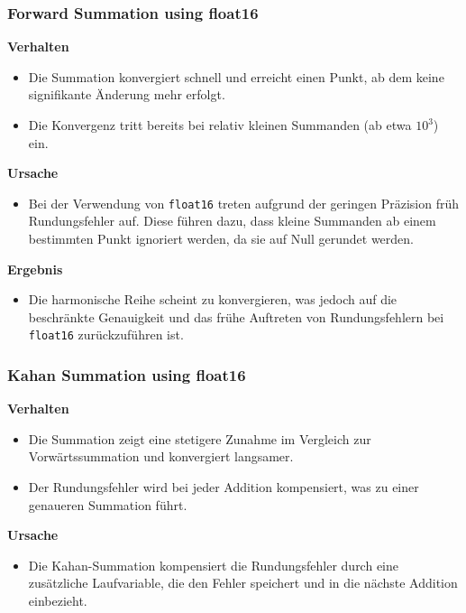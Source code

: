 \documentclass{scrartcl}
\begin{document}
\subsubsection{Forward Summation using float16}

\textbf{Verhalten}
\begin{itemize}
    \item Die Summation konvergiert schnell und erreicht einen Punkt, ab dem keine signifikante Änderung mehr erfolgt.
    \item Die Konvergenz tritt bereits bei relativ kleinen Summanden (ab etwa \(10^3\)) ein.
\end{itemize}

\textbf{Ursache}
\begin{itemize}
    \item Bei der Verwendung von \texttt{float16} treten aufgrund der geringen Präzision früh Rundungsfehler auf.
          Diese führen dazu, dass kleine Summanden ab einem bestimmten Punkt ignoriert
          werden, da sie auf Null gerundet werden.
\end{itemize}

\textbf{Ergebnis}
\begin{itemize}
    \item Die harmonische Reihe scheint zu konvergieren, was jedoch auf die beschränkte Genauigkeit und das frühe Auftreten von Rundungsfehlern bei \texttt{float16} zurückzuführen ist.
\end{itemize}

\subsubsection{Kahan Summation using float16}

\textbf{Verhalten}
\begin{itemize}
    \item Die Summation zeigt eine stetigere Zunahme im Vergleich zur Vorwärtssummation und konvergiert langsamer.
    \item Der Rundungsfehler wird bei jeder Addition kompensiert, was zu einer genaueren Summation führt.
\end{itemize}

\textbf{Ursache}
\begin{itemize}
    \item Die Kahan-Summation kompensiert die Rundungsfehler durch eine zusätzliche Laufvariable, die den Fehler speichert und in die nächste Addition einbezieht.
\end{itemize}
\end{document}

